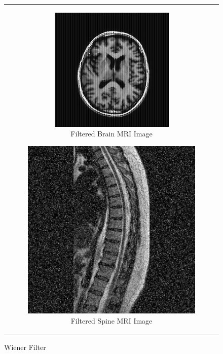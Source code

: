 \documentclass[hidelinks,12pt]{article}
\begin{document}
	\begin{figure}[!h]
		\centering
		\begin{tabular}{c}
			\begin{subfigure}[h]{0.45\textwidth}
				\centering
				\includegraphics[width=\textwidth]{figures/wiener/brain.jpg}
				\caption{Filtered Brain MRI Image}
			\end{subfigure}
			\hfill
			\begin{subfigure}[h]{0.45\textwidth}
				\centering
				\includegraphics[width=\textwidth]{figures/wiener/spine.jpg}
				\caption{Filtered Spine MRI Image}
			\end{subfigure}
		\end{tabular}
		\caption{Wiener Filter}
	\end{figure}
	
\end{document}

